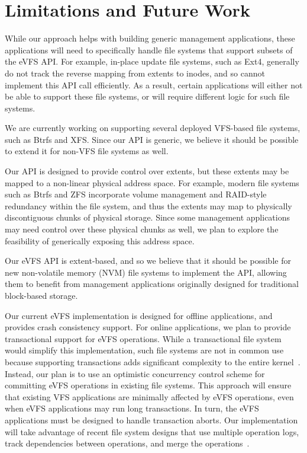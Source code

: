 \vspace{-0.25em}
\section{Limitations and Future Work\label{sec:Future_Work}}

While our approach helps with building generic management applications, these applications will need to specifically handle file systems that support subsets of the eVFS API. For example, in-place update file systems, such as Ext4, generally do not track the reverse mapping from extents to inodes, and so cannot implement this API call efficiently. As a result, certain applications will either not be able to support these file systems, or will require different logic for such file systems.

We are currently working on supporting several deployed VFS-based file systems, such as Btrfs and XFS. Since our API is generic, we believe it should be possible to extend it for non-VFS file systems as well.

Our API is designed to provide control over extents, but these extents may be mapped to a non-linear physical address space. For example, modern file systems such as Btrfs and ZFS incorporate volume management and RAID-style redundancy within the file system, and thus the extents may map to physically discontiguous chunks of physical storage. Since some management applications may need control over these physical chunks as well, we plan to explore the feasibility of generically exposing this address space.

Our eVFS API is extent-based, and so we believe that it should be possible for new non-volatile memory (NVM) file systems to implement the API, allowing them to benefit from management applications originally designed for traditional block-based storage.

Our current eVFS implementation is designed for offline applications, and provides crash consistency support. For online applications, we plan to provide transactional support for eVFS operations. While a transactional file system would simplify this implementation, such file systems are not in common use because supporting transactions adds significant complexity to the entire kernel~\cite{Spillane2009}. Instead, our plan is to use an optimistic concurrency control scheme for committing eVFS operations in existing file systems. This approach will ensure that existing VFS applications are minimally affected by eVFS operations, even when eVFS applications may run long transactions. In turn, the eVFS applications must be designed to handle transaction aborts. Our implementation will take advantage of recent file system designs that use multiple operation logs, track dependencies between operations, and merge the operations~\cite{Pillai2017, Bhat2017}.
